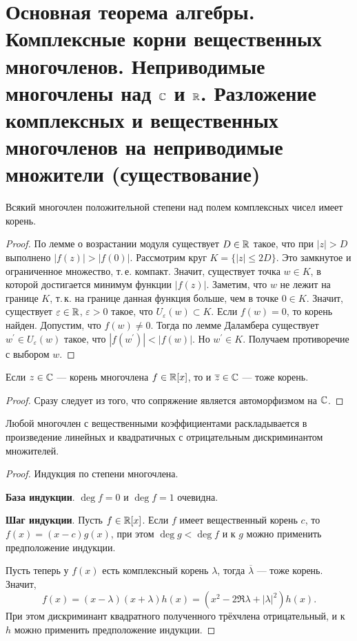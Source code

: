 \section{Основная теорема алгебры. Комплексные корни вещественных многочленов. Неприводимые многочлены над $\mathbb{C}$ и $\mathbb{R}$. Разложение комплексных и вещественных многочленов на неприводимые множители (существование)}

\begin{theorem}
    Всякий многочлен положительной степени над полем комплексных чисел имеет корень.
\end{theorem}

\begin{proof}
    По лемме о возрастании модуля существует $D \in \mathbb{R}$ такое, что при $|z| > D$ выполнено $|f(z)| > |f(0)|$. Рассмотрим круг $K = \{|z| \leqslant 2D\}$. Это замкнутое и ограниченное множество, т.\,е. компакт. Значит, существует точка $w \in K$, в которой достигается минимум функции $|f(z)|$. Заметим, что $w$ не лежит на границе $K$, т.\,к. на границе данная функция больше, чем в точке $0 \in K$. Значит, существует $\varepsilon \in \mathbb{R}$, $\varepsilon > 0$ такое, что $U_\varepsilon(w) \subset K$. Если $f(w) = 0$, то корень найден. Допустим, что $f(w) \ne 0$. Тогда по лемме Даламбера существует $w^\prime \in U_\varepsilon(w)$ такое, что $|f(w^\prime)| < |f(w)|$. Но $w^\prime \in K$. Получаем противоречие с выбором $w$.
\end{proof}

\begin{lemma}
    Если $z \in \mathbb{C}$ --- корень многочлена $f \in \mathbb{R}[x]$, то и $\overline{z} \in \mathbb{C}$ --- тоже корень.
\end{lemma}

\begin{proof}
    Сразу следует из того, что сопряжение является автоморфизмом на $\mathbb{C}$.
\end{proof}

\begin{statement}
    Любой многочлен с вещественными коэффициентами раскладывается в произведение линейных и квадратичных с отрицательным дискриминантом множителей.
\end{statement}

\begin{proof}
    Индукция по степени многочлена.

    \textbf{База индукции}. $\deg f = 0$ и $\deg f = 1$ очевидна.

    \textbf{Шаг индукции}. Пусть $f \in \mathbb{R}[x]$. Если $f$ имеет вещественный корень $c$, то $f(x) = (x - c)g(x)$, при этом $\deg g < \deg f$ и к $g$ можно применить предположение индукции.

    Пусть теперь у $f(x)$ есть комплексный корень $\lambda$, тогда $\overline{\lambda}$ --- тоже корень. Значит, 
    $$
    f(x) = (x - \lambda)(x + \lambda)h(x) = (x^2 - 2\Re\lambda + |\lambda|^2)h(x).
    $$
    При этом дискриминант квадратного полученного трёхчлена отрицательный, и к $h$ можно применить предположение индукции.
\end{proof}


